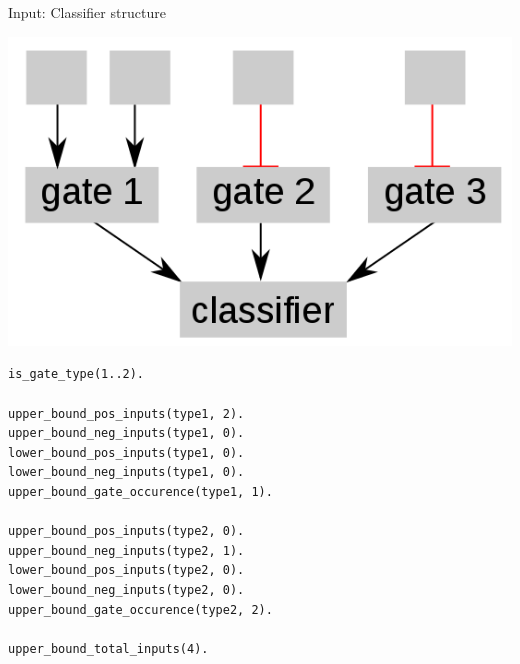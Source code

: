 \documentclass[10pt,dvipsnames]{beamer}
\begin{document}
\begin{frame}[fragile]{Input: Classifier structure}
\begin{center}
\includegraphics[scale=0.18]{classifier.png}
\end{center}
\color{my_example_color}\small
\begin{verbatim}
is_gate_type(1..2).

upper_bound_pos_inputs(type1, 2).
upper_bound_neg_inputs(type1, 0).
lower_bound_pos_inputs(type1, 0).
lower_bound_neg_inputs(type1, 0).
upper_bound_gate_occurence(type1, 1).

upper_bound_pos_inputs(type2, 0).
upper_bound_neg_inputs(type2, 1).
lower_bound_pos_inputs(type2, 0).
lower_bound_neg_inputs(type2, 0).
upper_bound_gate_occurence(type2, 2).

upper_bound_total_inputs(4).
\end{verbatim}
\end{frame}
\end{document}
